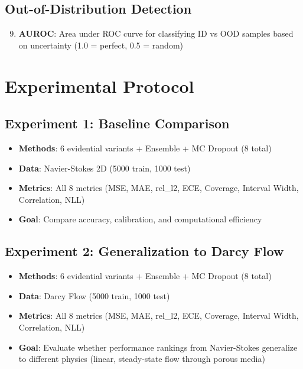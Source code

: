 \subsection{Out-of-Distribution Detection}

\begin{enumerate}
\setcounter{enumi}{8}
\item \textbf{AUROC}: Area under ROC curve for classifying ID vs OOD samples based on uncertainty (1.0 = perfect, 0.5 = random)
\end{enumerate}

\section{Experimental Protocol} %

\subsection{Experiment 1: Baseline Comparison}

\begin{itemize}
\item \textbf{Methods}: 6 evidential variants + Ensemble + MC Dropout (8 total)
\item \textbf{Data}: Navier-Stokes 2D (5000 train, 1000 test)
\item \textbf{Metrics}: All 8 metrics (MSE, MAE, rel\_l2, ECE, Coverage, Interval Width, Correlation, NLL)
\item \textbf{Goal}: Compare accuracy, calibration, and computational efficiency
\end{itemize}

\subsection{Experiment 2: Generalization to Darcy Flow}

\begin{itemize}
\item \textbf{Methods}: 6 evidential variants + Ensemble + MC Dropout (8 total)
\item \textbf{Data}: Darcy Flow (5000 train, 1000 test)
\item \textbf{Metrics}: All 8 metrics (MSE, MAE, rel\_l2, ECE, Coverage, Interval Width, Correlation, NLL)
\item \textbf{Goal}: Evaluate whether performance rankings from Navier-Stokes generalize to different physics (linear, steady-state flow through porous media)
\end{itemize}

